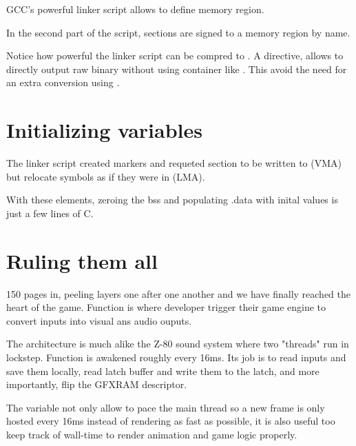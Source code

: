  GCC's powerful linker script allows to define memory region.





In the second part of the script, sections are signed to a memory region by name.



\begin{trivia}
Notice how powerful the linker script can be compred to . A directive,  allows to directly output raw binary without using container like . This avoid the need for an extra conversion using .
\end{trivia}

\section{Initializing variables}
The linker script created markers and requeted section  to be written to  (VMA) but relocate symbols as if they were in  (LMA).

With these elements, zeroing the bss and populating .data with inital values is just a few lines of C.





\section{Ruling them all}
150 pages in, peeling layers one after one another and we have finally reached the heart of the game. Function  is where developer trigger their game engine to convert inputs into visual ans audio ouputs.

The architecture is much alike the Z-80 sound system where two "threads" run in lockstep. Function  is awakened roughly every 16ms. Its job is to read inputs and save them locally, read latch buffer and write them to the latch, and more importantly, flip the GFXRAM descriptor. 

\begin{trivia}
The  variable not only allow to pace the main thread so a new frame is only hosted every 16ms instead of rendering as fast as possible, it is also useful too keep track of wall-time to render animation and game logic properly.
\end{trivia}

